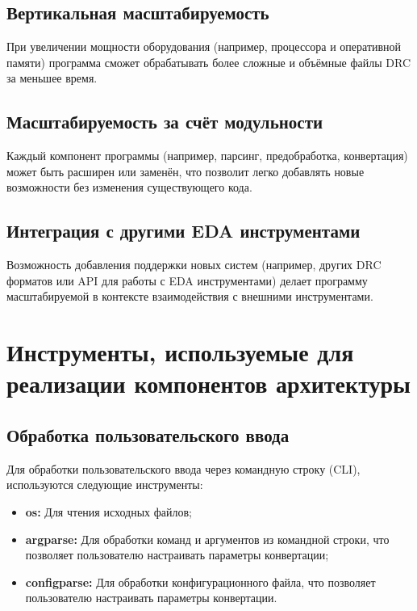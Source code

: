 \subsection{Вертикальная масштабируемость}

При увеличении мощности оборудования
(например, процессора и оперативной памяти)
программа сможет обрабатывать более сложные
и объёмные файлы DRC за меньшее время.
  
\subsection{Масштабируемость за счёт модульности}

Каждый компонент программы (например, парсинг, предобработка, конвертация)
может быть расширен или заменён,
что позволит легко добавлять новые возможности
без изменения существующего кода.
  
\subsection{Интеграция с другими EDA инструментами}

Возможность добавления поддержки новых систем
(например, других DRC форматов или API для работы с EDA инструментами)
делает программу масштабируемой
в контексте взаимодействия с внешними инструментами.

\section{Инструменты, используемые для реализации компонентов архитектуры}

\subsection{Обработка пользовательского ввода}

Для обработки пользовательского ввода
через командную строку (CLI), используются следующие инструменты:

\begin{itemize}
	\item \textbf{os:} Для чтения исходных файлов;
	\item \textbf{argparse:} Для обработки команд
		и аргументов из командной строки,
		что позволяет пользователю настраивать параметры конвертации;
	\item \textbf{configparse:} Для обработки конфигурационного файла,
		что позволяет пользователю настраивать параметры конвертации.
\end{itemize}


